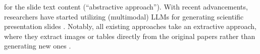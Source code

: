 for the slide text content (``abstractive approach''). %
With recent advancements, 
researchers have started utilizing %
(multimodal) LLMs 
for generating scientific presentation slides \cite{mondal-etal-2024-presentations,maheshwari-etal-2024-presentations,bandyopadhyay-etal-2024-enhancing-presentation1}. %
Notably, all existing approaches take an extractive approach, where they extract images or tables directly from the original papers rather than generating new ones \cite{Sravanthi2009SlidesGenAG,sun-etal-2021-d2s,Fu2021DOC2PPTAP,mondal-etal-2024-presentations,bandyopadhyay-etal-2024-enhancing-presentation1}.
